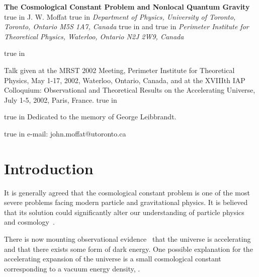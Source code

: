\documentclass[a4paper,12pt]{article}
\begin{document}
\pagestyle{plain}
\setcounter{page}{1}
\begin{center}
{\large\bf The Cosmological Constant Problem and Nonlocal Quantum Gravity}
 true in {\large J. W. Moffat}
 true in {\it Department of Physics, University of Toronto,
Toronto, Ontario M5S 1A7, Canada}
 true in and
 true
in {\it Perimeter Institute for Theoretical Physics, Waterloo, Ontario N2J
2W9, Canada}

\date{\today}
\begin{abstract}%
A nonlocal quantum gravity theory is presented which is finite and unitary
to all orders of perturbation theory. Vertex form factors in Feynman
diagrams involving gravitons suppress graviton and matter vacuum
fluctuation loops by introducing a low-energy gravitational scale,
\coordHE{} eV. Gravitons coupled to
non-vacuum matter loops and matter tree graphs are controlled by a vertex
form factor with the energy scale, \coordHE{} TeV. A satellite
E\"otv\"os experiment is proposed to test a violation of the equivalence
principle for coupling of gravitons to pure vacuum energy compared to
matter. \end{abstract}

 true in
\end{center}
Talk given at the MRST 2002 Meeting, Perimeter Institute for Theoretical
Physics, May 1-17, 2002, Waterloo, Ontario, Canada, and at the XVIIIth IAP
Colloquium: Observational and Theoretical Results on the Accelerating
Universe, July 1-5, 2002, Paris, France.
 true in

 true in
Dedicated to the memory of George Leibbrandt.

 true in
e-mail: john.moffat@utoronto.ca


\section{\bf Introduction}

It is generally agreed that the cosmological constant problem is
one of the most severe problems facing modern particle and gravitational
physics. It is believed that its solution could significantly alter our
understanding of particle physics and cosmology~\cite{Straumann}.

There is now mounting observational evidence~\cite{Perlmutter} that
the universe is accelerating and that there exists some form of dark
energy. One possible explanation for the accelerating expansion of the
universe is a small cosmological constant corresponding to a vacuum energy
density, \coordHE{}.
\end{document}
